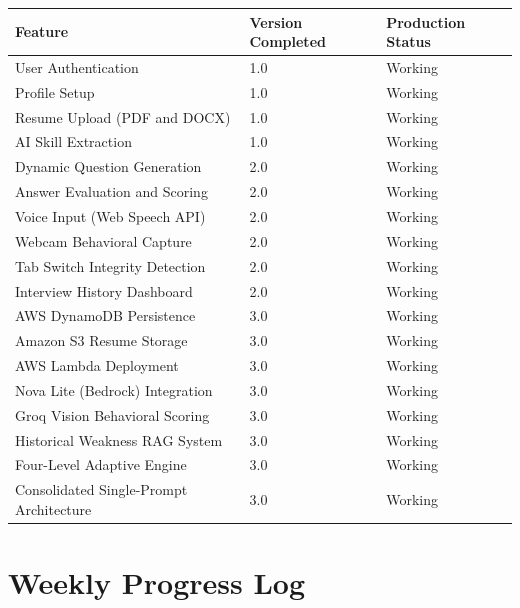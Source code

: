 \documentclass[12pt,a4paper]{article}
\begin{document}
\begin{longtable}{|p{6cm}|p{3cm}|p{4cm}|}
\hline
\textbf{Feature} & \textbf{Version Completed} & \textbf{Production Status} \\
\hline
User Authentication & 1.0 & Working \\
\hline
Profile Setup & 1.0 & Working \\
\hline
Resume Upload (PDF and DOCX) & 1.0 & Working \\
\hline
AI Skill Extraction & 1.0 & Working \\
\hline
Dynamic Question Generation & 2.0 & Working \\
\hline
Answer Evaluation and Scoring & 2.0 & Working \\
\hline
Voice Input (Web Speech API) & 2.0 & Working \\
\hline
Webcam Behavioral Capture & 2.0 & Working \\
\hline
Tab Switch Integrity Detection & 2.0 & Working \\
\hline
Interview History Dashboard & 2.0 & Working \\
\hline
AWS DynamoDB Persistence & 3.0 & Working \\
\hline
Amazon S3 Resume Storage & 3.0 & Working \\
\hline
AWS Lambda Deployment & 3.0 & Working \\
\hline
Nova Lite (Bedrock) Integration & 3.0 & Working \\
\hline
Groq Vision Behavioral Scoring & 3.0 & Working \\
\hline
Historical Weakness RAG System & 3.0 & Working \\
\hline
Four-Level Adaptive Engine & 3.0 & Working \\
\hline
Consolidated Single-Prompt Architecture & 3.0 & Working \\
\hline
\end{longtable}

\newpage

\section{Weekly Progress Log}
\end{document}
